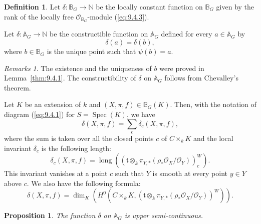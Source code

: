 \documentclass[12pt,a4paper,oneside,english,leqno]{smfart}
\numberwithin{equation}{subsection}
\newcounter{theo}
\numberwithin{theo}{subsection}
\theoremstyle{plain}
\newtheorem{proposition}[theo]{Proposition}
\theoremstyle{definition}
\newtheorem{definition}[theo]{Definition}
\theoremstyle{remark}
\newtheorem{remarks}[theo]{Remarks}
\DeclareMathOperator{\Spec}{Spec}
\DeclareMathOperator{\lng}{long}
\newcommand{\NN}{\mathbb{N}}
\newcommand{\AAA}{\mathbb{A}}
\newcommand{\BBB}{\mathbb{B}}
\newcommand{\oc}{\mathcal{O}}
\newcommand{\tgo}{\mathfrak{t}}
\begin{document}
\begin{definition}\label{thm:9.4.2}
Let $\delta:\BBB_G\to\NN$ be the locally constant function on $\BBB_G$ given by the rank of the locally free $\oc_{\BBB_G}$-module (\ref{eq:9.4.3}).
\end{definition}

Let $\delta:\AAA_G\to\NN$ be the constructible function on $\AAA_G$ defined for every $a\in\AAA_G$ by
\[
\delta(a)=\delta(b),
\]
where $b\in\BBB_G$ is the unique point such that $\psi(b)=a$.

\begin{remarks}\label{thm:9.4.3}
The existence and the uniqueness of $b$ were proved in Lemma~\ref{thm:9.4.1}. The constructibility of $\delta$ on $\AAA_G$ follows from Chevalley's theorem.

Let $K$ be an extension of $k$ and $(X,\pi,f)\in\BBB_G(K)$. Then, with the notation of diagram (\ref{eq:9.4.1}) for $S=\Spec(K)$, we have
\[
\delta(X,\pi,f)=\sum_c\delta_c(X,\pi,f),
\]
where the sum is taken over all the closed points $c$ of $C\times_k K$ and the local invariant $\delta_c$ is the following length:
\[
\delta_c(X,\pi,f)=\lng((\tgo\otimes_k\pi_{Y,*}(\rho_*\oc_X/\oc_Y))^W_c).
\]
This invariant vanishes at a point $c$ such that $Y$ is smooth at every point $y\in Y$ above $c$. We also have the following formula:
\[
\delta(X,\pi,f)=\dim_K(H^0(C\times_k K,(\tgo\otimes_k\pi_{Y,*}(\rho_*\oc_X/\oc_Y))^W)).
\]
\end{remarks}

\begin{proposition}\label{thm:9.4.4}
The function $\delta$ on $\AAA_G$ is upper semi-continuous.
\end{proposition}
\end{document}
